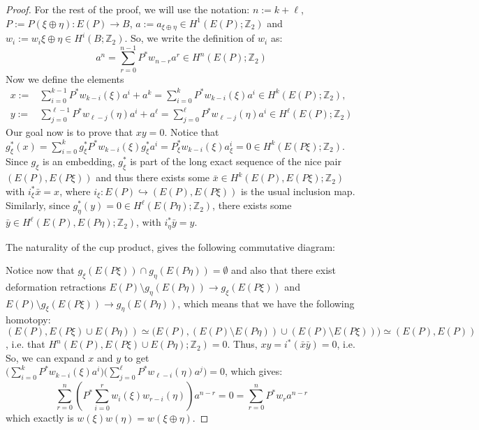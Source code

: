 \begin{proof}
For the rest of the proof, we will use the notation: $n:=k+\ell$, $P:=P(\xi\oplus\eta):E(P)\to B$, $a:=a_{\xi\oplus\eta}\in H^1(E(P);\mathbb{Z}_2)$ and $w_i:=w_i{\xi\oplus\eta}\in H^i(B;\mathbb{Z}_2)$. So, we write the definition of $w_i$ as:
\[a^n=\sum_{r=0}^{n-1}P^*w_{n-r}a^r\in H^n(E(P);\mathbb{Z}_2)\]
Now we define the elements
\begin{align*}
x:=&\sum_{i=0}^{k-1}P^*w_{k-i}(\xi)a^i+a^k=\sum_{i=0}^kP^*w_{k-i}(\xi)a^i\in H^k(E(P);\mathbb{Z}_2),\\
y:=&\sum_{j=0}^{\ell-1}P^*w_{\ell-j}(\eta)a^i+a^{\ell}=\sum_{j=0}^{\ell}P^*w_{\ell-j}(\eta)a^i\in H^{\ell}(E(P);\mathbb{Z}_2)
\end{align*}
Our goal now is to prove that $xy=0$. Notice that $g_{\xi}^*(x)=\sum_{i=0}^kg_{\xi}^*P^*w_{k-i}(\xi)g_{\xi}^*a^i=P_{\xi}^*w_{k-i}(\xi)a_{\xi}^i=0\in H^k(E(P\xi);\mathbb{Z}_2)$. Since $g_{\xi}$ is an embedding, $g_{\xi}^*$ is part of the long exact sequence of the nice pair $(E(P),E(P\xi))$ and thus there exists some $\bar{x}\in H^k(E(P),E(P\xi);\mathbb{Z}_2)$ with $i_{\xi}^*\bar{x}=x$, where $i_{\xi}:E(P)\hookrightarrow(E(P),E(P\xi))$ is the usual inclusion map. Similarly, since $g_{\eta}^*(y)=0\in H^{\ell}(E(P\eta);\mathbb{Z}_2)$, there exists some $\bar{y}\in H^{\ell}(E(P),E(P\eta);\mathbb{Z}_2)$, with $i_{\eta}^*\bar{y}=y$.

The naturality of the cup product, gives the following commutative diagram:
\begin{center}
\end{center}
Notice now that $g_{\xi}(E(P\xi))\cap g_{\eta}(E(P\eta))=\emptyset$ and also that there exist deformation retractions $E(P)\setminus g_{\eta}(E(P\eta))\to g_{\xi}(E(P\xi))$ and $E(P)\setminus g_{\xi}(E(P\xi))\to g_{\eta}(E(P\eta))$, which means that we have the following homotopy: $(E(P),E(P\xi)\cup E(P\eta))\simeq\big(E(P),(E(P)\setminus E(P\eta))\cup(E(P)\setminus E(P\xi))\big)\simeq(E(P),E(P))$, i.e. that $H^n(E(P),E(P\xi)\cup E(P\eta);\mathbb{Z}_2)=0$. Thus, $xy=i^*(\bar{x}\bar{y})=0$, i.e. So, we can expand $x$ and $y$ to get $\big(\sum_{i=0}^kP^*w_{k-i}(\xi)a^i\big)\big(\sum_{j=0}^{\ell}P^*w_{\ell-i}(\eta)a^j\big)=0$, which gives:
\[\sum_{r=0}^n\left(P^*\sum_{i=0}^rw_i(\xi)w_{r-i}(\eta)\right)a^{n-r}=0=\sum_{r=0}^nP^*w_ra^{n-r}\]
which exactly is $w(\xi)w(\eta)=w(\xi\oplus\eta)$.
\end{proof}


